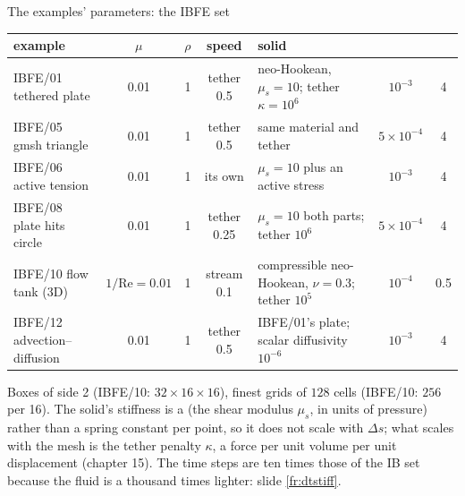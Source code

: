 \documentclass[aspectratio=169,11pt]{beamer}
\begin{document}
\begin{frame}{The examples' parameters: the IBFE set}
\label{fr:table2}
\scriptsize
\setlength{\tabcolsep}{3pt}
\begin{tabular}{@{}L{0.2\textwidth}cccL{0.3\textwidth}cc@{}}
\toprule
example & $\mu$ & $\rho$ & speed & solid &  & \\
\midrule
IBFE/01 tethered plate & 0.01 & 1 & tether 0.5 & neo-Hookean, $\mu_s = 10$; tether $\kappa = 10^6$ & $10^{-3}$ & 4\\
IBFE/05 gmsh triangle & 0.01 & 1 & tether 0.5 & same material and tether & $5\times10^{-4}$ & 4\\
IBFE/06 active tension & 0.01 & 1 & its own & $\mu_s = 10$ plus an active stress & $10^{-3}$ & 4\\
IBFE/08 plate hits circle & 0.01 & 1 & tether 0.25 & $\mu_s = 10$ both parts; tether $10^6$ & $5\times10^{-4}$ & 4\\
IBFE/10 flow tank (3D) & $1/\mathrm{Re} = 0.01$ & 1 & stream 0.1 & compressible neo-Hookean, $\nu = 0.3$; tether $10^5$ & $10^{-4}$ & 0.5\\
IBFE/12 advection--diffusion & 0.01 & 1 & tether 0.5 & IBFE/01's plate; scalar diffusivity $10^{-6}$ & $10^{-3}$ & 4\\
\bottomrule
\end{tabular}

\vspace{2mm}
\small Boxes of side 2 (IBFE/10: $32\times16\times16$), finest grids of $128$ cells (IBFE/10: $256$ per 16). The solid's stiffness is a  (the shear modulus $\mu_s$, in units of pressure) rather than a spring constant per point, so it does not scale with $\Delta s$; what scales with the mesh is the tether penalty $\kappa$, a force per unit volume per unit displacement (chapter 15). The time steps are ten times those of the IB set because the fluid is a thousand times lighter: slide \ref{fr:dtstiff}.
\end{frame}
\end{document}
